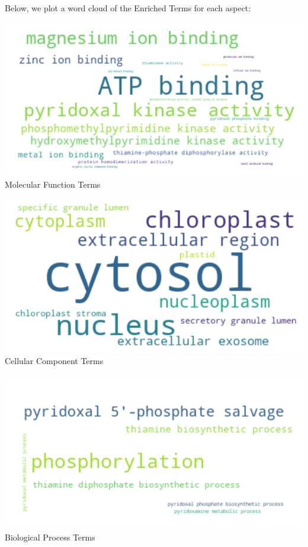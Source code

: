 \documentclass[10pt,twocolumn,letterpaper]{article}
\begin{document}
Below, we plot a word cloud of the Enriched Terms for each aspect:

\begin{center}
    \includegraphics[scale=0.35]{report/img/word_cloud_mf.png} \\
    \small{Molecular Function Terms}
\end{center}

\begin{center}
    \includegraphics[scale=0.35]{report/img/word_cloud_cc.png} \\
    \small{Cellular Component Terms}
\end{center}

\begin{center}
    \includegraphics[scale=0.35]{report/img/word_cloud_bp.png} \\
    \small{Biological Process Terms}
\end{center} \\
\end{document}
